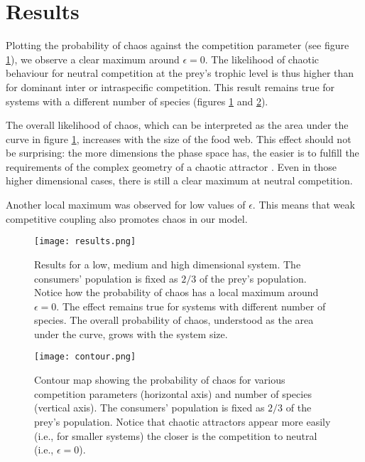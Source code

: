 \section{Results}
\label{sec:Results}
Plotting the probability of chaos against the competition parameter (see figure \ref{fig:Results}), we observe a clear maximum around $ \epsilon = 0 $. The likelihood of chaotic behaviour for neutral competition at the prey's trophic level is thus higher than for dominant inter or intraspecific competition. This result remains true for systems with a different number of species (figures \ref{fig:Results} and \ref{fig:Contour}).

The overall likelihood of chaos, which can be interpreted as the area under the curve in figure \ref{fig:Results}, increases with the size of the food web. This effect should not be surprising: the more dimensions the phase space has, the easier is to fulfill the requirements of the complex geometry of a chaotic attractor \citep{Strogatz1994}. Even in those higher dimensional cases, there is still a clear maximum at neutral competition.

Another local maximum was observed for low values of $ \epsilon $. This means that weak competitive coupling also promotes chaos in our model.

\begin{figure}
	\begin{center}
		\texttt{[image: results.png]}
	\end{center}
	\caption{Results for a low, medium and high dimensional system. The consumers' population is fixed as $ 2/3 $ of the prey's population. Notice how the probability of chaos has a local maximum around $\epsilon = 0$. The effect remains true for systems with different number of species. The overall probability of chaos, understood as the area under the curve, grows with the system size. }
	\label{fig:Results}
\end{figure}

\begin{figure}
	\begin{center}
		\texttt{[image: contour.png]}
	\end{center}
	\caption{Contour map showing the probability of chaos for various competition parameters (horizontal axis) and number of species (vertical axis). The consumers' population is fixed as $ 2/3 $ of the prey's population. Notice that chaotic attractors appear more easily (i.e., for smaller systems) the closer is the competition to neutral (i.e., $ \epsilon = 0 $).}
	\label{fig:Contour}
\end{figure}
